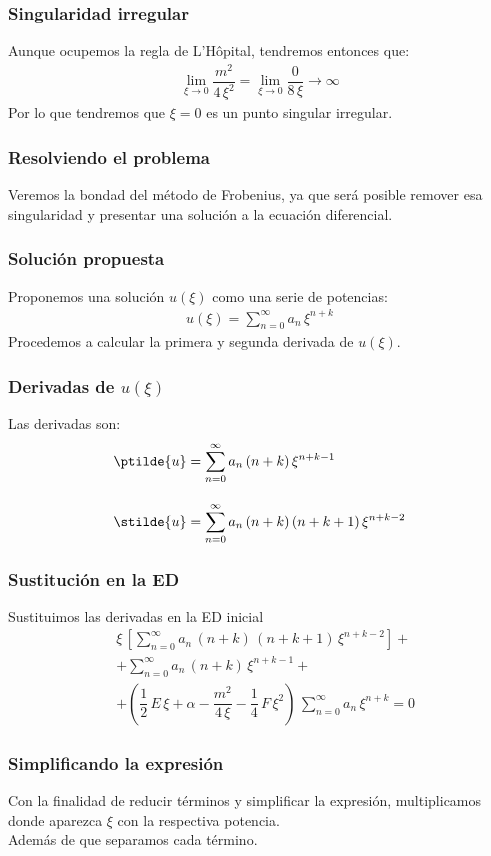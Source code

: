 \begin{frame}
\frametitle{Singularidad irregular}
Aunque ocupemos la regla de L'Hôpital, tendremos entonces que:
\begin{align*}
\lim_{\xi \to 0} \dfrac{m^{2}}{4 \, \xi^{2}} = \lim_{\xi \to 0} \dfrac{0}{8 \, \xi} \to \infty
\end{align*}
\pause
Por lo que tendremos que $\xi = 0$ es un punto singular irregular. 
\end{frame}
\begin{frame}
\frametitle{Resolviendo el problema}
Veremos la bondad del método de Frobenius, ya que será posible remover esa singularidad y presentar una solución a la ecuación diferencial.
\end{frame}
\begin{frame}
\frametitle{Solución propuesta}
Proponemos una solución $u(\xi)$ como una serie de potencias:
\begin{align*}
u(\xi) = \sum_{n=0}^{\infty} a_{n} \, \xi^{n+k}
\end{align*}
\pause
Procedemos a calcular la primera y segunda derivada de $u(\xi)$.
\end{frame}
\begin{frame}
\frametitle{Derivadas de $u(\xi)$}
Las derivadas son:
\begin{align*}
\ptilde{u} &= \sum_{n=0}^{\infty} a_{n} \, (n + k) \, \xi^{n+k-1} \\[1em]
\stilde{u} &= \sum_{n=0}^{\infty} a_{n} \, (n + k) \, (n + k + 1) \, \xi^{n+k-2}
\end{align*}
\end{frame}
\begin{frame}
\frametitle{Sustitución en la ED}
Sustituimos las derivadas en la ED inicial
\begin{align*}
&\xi \, \left[ \sum_{n=0}^{\infty} a_{n} \, (n {+} k) \, (n {+} k {+} 1) \, \xi^{n{+}k{-}2} \right] + \\[1em]
&+ \sum_{n=0}^{\infty} a_{n} \, (n {+} k) \, \xi^{n{+}k{-}1} + \\[1em]
&+ \left( \dfrac{1}{2} \, E \, \xi {+} \alpha {-} \dfrac{m^{2}}{4 \, \xi} {-} \dfrac{1}{4} \, F \, \xi^{2} \right) \, \sum_{n=0}^{\infty} a_{n} \, \xi^{n{+}k} = 0
\end{align*}
\end{frame}
\begin{frame}
\frametitle{Simplificando la expresión}
Con la finalidad de reducir términos y simplificar la expresión, multiplicamos donde aparezca $\xi$ con la respectiva potencia.
\\
\bigskip
Además de que separamos cada término.
\end{frame}
